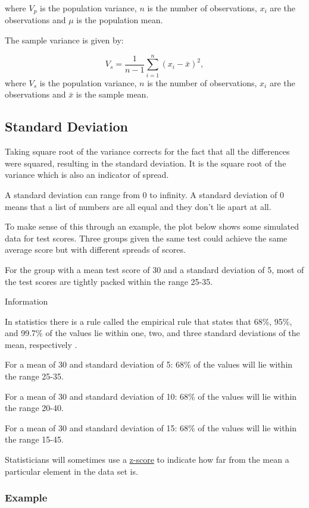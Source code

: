 \documentclass[
]{book}
\begin{document}
where \(V_p\) is the population variance, \(n\) is the number of observations, \(x_i\) are the observations and \(\mu\) is the population mean.

The sample variance is given by:

\[V_{s} = \frac{1}{n-1}\sum_{i=1}^n (x_i - \bar{x})^2,\]
where \(V_s\) is the population variance, \(n\) is the number of observations, \(x_i\) are the observations and \(\bar{x}\) is the sample mean.

\hypertarget{stdv}{%
\subsection{Standard Deviation}\label{stdv}}

Taking square root of the variance corrects for the fact that all the differences were squared, resulting in the standard deviation. It is the square root of the variance which is also an indicator of spread.

A standard deviation can range from 0 to infinity. A standard deviation of 0 means that a list of numbers are all equal and they don't lie apart at all.

To make sense of this through an example, the plot below shows some simulated data for test scores. Three groups given the same test could achieve the same average score but with different spreads of scores.

For the group with a mean test score of 30 and a standard deviation of 5, most of the test scores are tightly packed within the range 25-35.

Information

In statistics there is a rule called the empirical rule that states that 68\%, 95\%, and 99.7\% of the values lie within one, two, and three standard deviations of the mean, respectively \citep{lee}.

For a mean of 30 and standard deviation of 5: 68\% of the values will lie within the range 25-35.

For a mean of 30 and standard deviation of 10: 68\% of the values will lie within the range 20-40.

For a mean of 30 and standard deviation of 15: 68\% of the values will lie within the range 15-45.

Statisticians will sometimes use a \protect\hyperlink{example2}{z-score} to indicate how far from the mean a particular element in the data set is.

\hypertarget{example-10}{%
\subsubsection{Example}\label{example-10}}
\end{document}
